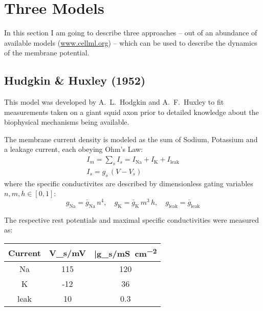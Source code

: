 \newcommand{\Vtilde}{\ensuremath{\tilde{V}}}

\section{Three Models}
In this section I am going to describe three approaches -- out of an
abundance of available models (\url{www.cellml.org}) -- which can be used to
describe the dynamics of the membrane potential.

\subsection{Hudgkin \& Huxley (1952)}
This model was developed by A.~L.~Hodgkin and A.~F.~Huxley to fit
measurements taken on a giant squid axon prior to detailed knowledge about
the biophysical mechanisms being available.

The membrane current density is modeled as the sum of Sodium, Potassium and
a leakage current, each obeying Ohm's Law:
\begin{gather}
    I_m = \sum_{s}I_{s}=I_{\mathrm{Na}}+I_{\mathrm{K}}+I_{\mathrm{leak}} \\
    I_s = g_s\,(V-V_s) \nonumber
\end{gather}
where the specific conductivites are described by dimensionless gating
variables $n, m, h\in[0,1]$:
\begin{equation*}
    g_{\mathrm{Na}}=\bar{g}_{\mathrm{Na}}\,n^4,\quad
    g_{\mathrm{K}}=\bar{g}_{\mathrm{K}}\,m^3\,h,\quad
    g_{\mathrm{leak}}=\bar{g}_{\mathrm{leak}}
\end{equation*}

The respective rest potentials and maximal specific conductivities were measured as:
\begin{table}[h!]
    \centering
    \begin{tabular}{c | C C}
        \toprule
        Current & V_s/\si{\milli\volt} &
        \bar{g}_s/\si{\milli\siemens\per\centi\metre\squared} \\
        \midrule
        Na      & 115   & 120   \\
        K       & -12   & 36    \\
        leak    & 10    & 0.3   \\
        \bottomrule
    \end{tabular}
\end{table}

